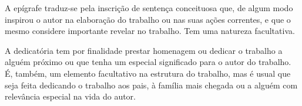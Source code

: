 



\frontmatter %

\pagestyle{plain} %



\makethetitlepage


\makeconttitlepage



\begin{epigraph}
\null \vfill
\begin{flushright}

A epígrafe traduz-se pela inscrição de sentença conceituosa que, de algum modo inspirou o autor na elaboração do trabalho ou nas suas ações correntes, e que o mesmo considere importante revelar no trabalho. Tem uma natureza facultativa.

\end{flushright}
\vfill \null%
\end{epigraph}%


\begin{dedicatory}
\null \vfill
\begin{flushright}


A dedicatória tem por finalidade prestar homenagem ou dedicar o trabalho a alguém próximo ou que tenha um especial significado para o autor do trabalho. É, também, um elemento facultativo na estrutura do trabalho, mas é usual que seja feita dedicando o trabalho aos pais, à família mais chegada ou a alguém com relevância especial na vida do autor. 


\end{flushright}
\vfill \null%
\end{dedicatory}%



